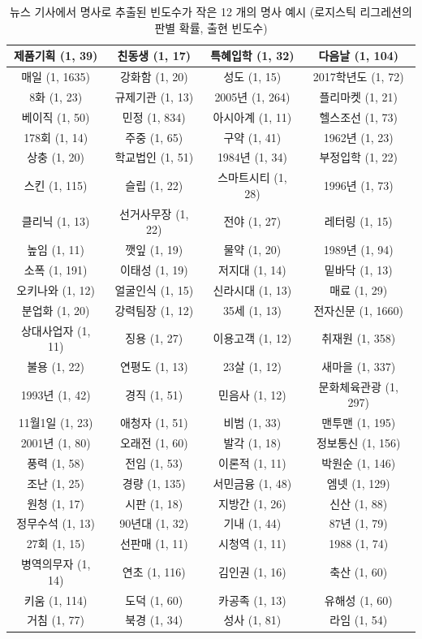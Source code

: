\documentclass[11pt]{article}
\begin{document}
\begin{table}[H]
\small
\centering
\caption{뉴스 기사에서 명사로 추출된 빈도수가 작은 12 개의 명사 예시 (로지스틱 리그레션의 판별 확률, 출현 빈도수)}
\label{tab:news_infrequent_top100}
\begin{tabular}{|c|c|c|c|}
\hline
제품기획 (1, 39) & 친동생 (1, 17) & 특혜입학 (1, 32) & 다음날 (1, 104) \\ \hline
매일 (1, 1635) & 강화함 (1, 20) & 성도 (1, 15) & 2017학년도 (1, 72) \\ \hline
8화 (1, 23) & 규제기관 (1, 13) & 2005년 (1, 264) & 플리마켓 (1, 21) \\ \hline
베이직 (1, 50) & 민정 (1, 834) & 아시아계 (1, 11) & 헬스조선 (1, 73) \\ \hline
178회 (1, 14) & 주중 (1, 65) & 구약 (1, 41) & 1962년 (1, 23) \\ \hline
상충 (1, 20) & 학교법인 (1, 51) & 1984년 (1, 34) & 부정입학 (1, 22) \\ \hline
스킨 (1, 115) & 슬립 (1, 22) & 스마트시티 (1, 28) & 1996년 (1, 73) \\ \hline
클리닉 (1, 13) & 선거사무장 (1, 22) & 전야 (1, 27) & 레터링 (1, 15) \\ \hline
높임 (1, 11) & 깻잎 (1, 19) & 물약 (1, 20) & 1989년 (1, 94) \\ \hline
소폭 (1, 191) & 이태성 (1, 19) & 저지대 (1, 14) & 밑바닥 (1, 13) \\ \hline
오키나와 (1, 12) & 얼굴인식 (1, 15) & 신라시대 (1, 13) & 매료 (1, 29) \\ \hline
분업화 (1, 20) & 강력팀장 (1, 12) & 35세 (1, 13) & 전자신문 (1, 1660) \\ \hline
상대사업자 (1, 11) & 징용 (1, 27) & 이용고객 (1, 12) & 취재원 (1, 358) \\ \hline
불용 (1, 22) & 연평도 (1, 13) & 23살 (1, 12) & 새마을 (1, 337) \\ \hline
1993년 (1, 42) & 경직 (1, 51) & 민음사 (1, 12) & 문화체육관광 (1, 297) \\ \hline
11월1일 (1, 23) & 애청자 (1, 51) & 비범 (1, 33) & 맨투맨 (1, 195) \\ \hline
2001년 (1, 80) & 오래전 (1, 60) & 발각 (1, 18) & 정보통신 (1, 156) \\ \hline
풍력 (1, 58) & 전임 (1, 53) & 이론적 (1, 11) & 박원순 (1, 146) \\ \hline
조난 (1, 25) & 경량 (1, 135) & 서민금융 (1, 48) & 엠넷 (1, 129) \\ \hline
원청 (1, 17) & 시판 (1, 18) & 지방간 (1, 26) & 신산 (1, 88) \\ \hline
정무수석 (1, 13) & 90년대 (1, 32) & 기내 (1, 44) & 87년 (1, 79) \\ \hline
27회 (1, 15) & 선판매 (1, 11) & 시청역 (1, 11) & 1988 (1, 74) \\ \hline
병역의무자 (1, 14) & 연초 (1, 116) & 김인권 (1, 16) & 축산 (1, 60) \\ \hline
키움 (1, 114) & 도덕 (1, 60) & 카공족 (1, 13) & 유해성 (1, 60) \\ \hline
거침 (1, 77) & 북경 (1, 34) & 성사 (1, 81) & 라임 (1, 54) \\ \hline
\end{tabular}%
\end{table}
\end{document}
